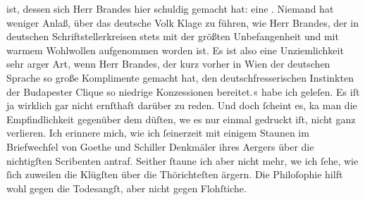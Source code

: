{{{                     ist, dessen sich Herr Brandes hier
                     schuldig gemacht hat: eine . Niemand
                     hat weniger Anlaß, über das deutsche Volk Klage zu führen, wie Herr Brandes, der in deutschen
                     Schriftstellerkreisen stets mit der größten Unbefangenheit und mit warmem
                     Wohlwollen aufgenommen worden ist. Es ist also eine Unziemlichkeit sehr arger
                     Art, wenn Herr Brandes, der kurz vorher
                     in Wien der deutschen Sprache so große
                     Komplimente gemacht hat, den deutschfresserischen Instinkten der Budapester Clique so niedrige Konzessionen
                     bereitet.«}}}\label{K_L01034-4} habe ich geleſen. Es iſt ja wirklich gar nicht
               ernſthaft darüber zu reden. Und doch{ }ſcheint es, ka{\geminationn} man
               die Empfindlichkeit gegenüber dem dü{\geminationm}ſten, we{\geminationn} es nur einmal gedruckt iſt, nicht ganz verlieren. Ich
               erinnere mich, wie ich{ }ſeinerzeit mit einigem Staunen im Briefwechſel von Goethe und Schiller Denkmäler ihres Aergers über die nichtigſten Scribenten antraf.
               Seither{ }ſtaune ich {\pb}aber nicht mehr, we{\geminationn} ich{ }ſehe, wie{ }ſich zuweilen die Klügſten über die
               Thörichteſten ärgern. Die Philoſophie hilft wohl gegen die Todesangſt, aber nicht
               gegen Flohſtiche.\pend
           
